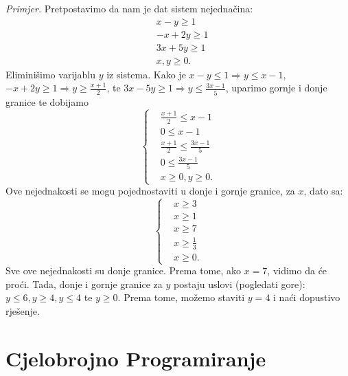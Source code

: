 \documentclass[a4paper, utf8, 11pt, colorlinks]{book}
\begin{document}
\emph{Primjer.} Pretpostavimo da nam je dat sistem nejednačina:
\begin{align*}
	 &x - y \geq 1 \\
	 &-x + 2y \geq 1 \\
	 & 3x + 5y \geq 1 \\
	 & x,y \geq 0.
\end{align*}
Eliminišimo varijablu $y$ iz sistema. Kako je $x-y \leq 1 \Rightarrow y \leq x -1 $, 
$-x + 2y \geq 1 \Rightarrow y \geq \frac{x+1}{2}$, te $ 3x - 5y \geq 1 \Rightarrow y \leq \frac{3x-1}{5}$, uparimo gornje i donje granice te dobijamo 
 $$
 \begin{cases}
 	&\frac{x+1}{2} \leq x-1 \\
 	& 0 \leq x-1 \\
 	& \frac{x+1}{2} \leq \frac{3x-1}{5} \\
 	& 0 \leq \frac{3x-1}{5} \\
 	& x \geq 0, y \geq 0.  	
 \end{cases}
 $$
Ove nejednakosti se mogu pojednostaviti u donje i gornje granice, 
za $x$, dato sa:
$$
\begin{cases}
    &x \geq 3 \\
    & x \geq 1 \\
    & x \geq 7 \\
    & x \geq \frac{1}{3} \\
    & x \geq 0.	
\end{cases}
$$
Sve ove nejednakosti su donje granice. Prema tome, ako $x=7$, vidimo da će proći. 
Tada, donje i gornje granice za $y$ postaju uslovi (pogledati gore): $y \leq 6, y \geq 4, y \leq 4$ te $y \geq 0$. Prema tome, možemo staviti $y=4$ i naći dopustivo rješenje. 

\newpage
\chapter{Cjelobrojno Programiranje}
\end{document}

